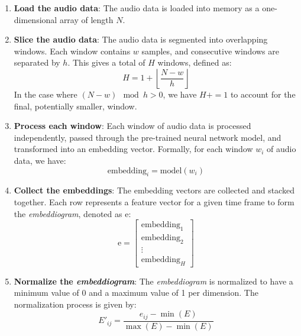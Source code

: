 \begin{enumerate}
\item \textbf{Load the audio data}: The audio data is loaded into memory as a one-dimensional array of length $N$.

\item \textbf{Slice the audio data}: The audio data is segmented into overlapping windows. Each window contains $w$ samples, and consecutive windows are separated by $h$. This gives a total of $H$ windows, defined as:
\begin{equation}
H = 1 + \left\lfloor \frac{N - w}{h} \right\rfloor
\end{equation}
In the case where $\left( N - w \right) \mod h > 0$, we have $H += 1$ to account for the final, potentially smaller, window.

\item \textbf{Process each window}: Each window of audio data is processed independently, passed through the pre-trained neural network model, and transformed into an embedding vector. Formally, for each window $w_i$ of audio data, we have:
\begin{equation}
\text{embedding}_i = \text{model}(w_i)
\end{equation}

\item \textbf{Collect the embeddings}: The embedding vectors are collected and stacked together. Each row represents a feature vector for a given time frame to form the \textit{embeddiogram}, denoted as $\text{e}$:
\begin{equation}
\text{e} = \begin{bmatrix} \text{embedding}_1 \\ \text{embedding}_2 \\ \vdots \\ \text{embedding}_H \end{bmatrix}
\end{equation}

\item \textbf{Normalize the \textit{embeddiogram}}: The \textit{embeddiogram} is normalized to have a minimum value of 0 and a maximum value of 1 per dimension. The normalization process is given by:
\begin{equation}
E'_{ij} = \frac{e_{ij} - \min(E)}{\max(E) - \min(E)}
\end{equation}
\end{enumerate}

